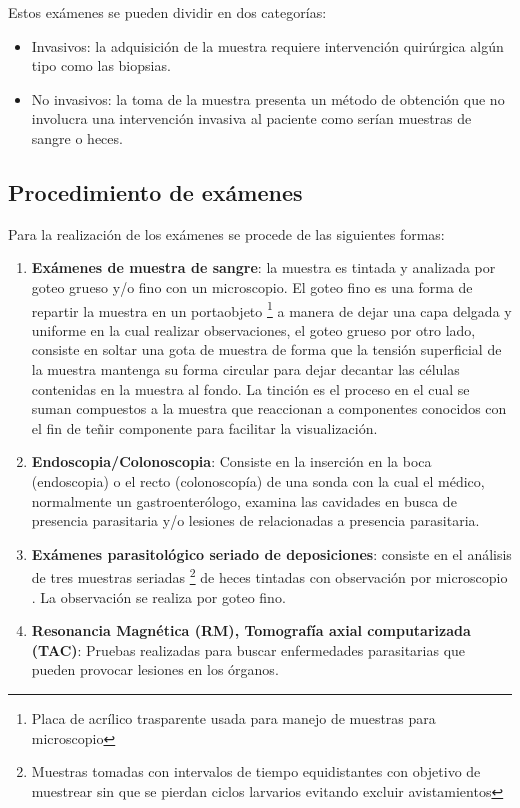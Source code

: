 \documentclass[letter,12pt]{report}
\begin{document}
Estos exámenes se pueden dividir en dos categorías:

\begin{itemize}
    \item Invasivos: la adquisición de la muestra requiere intervención
        quirúrgica algún tipo como las biopsias.
    \item No invasivos: la toma de la muestra presenta un método de obtención que no
        involucra una intervención invasiva al paciente como serían muestras de sangre o
        heces.
\end{itemize}

\subsection{Procedimiento de exámenes}

Para la realización de los exámenes se procede de las siguientes formas: \cite{Diagnost}

\begin{enumerate}
    \item \textbf{Exámenes de muestra de sangre}: la muestra es tintada y analizada por
        goteo grueso y/o fino con un microscopio. El goteo fino es una forma de repartir
        la muestra en un portaobjeto \footnote{Placa de acrílico trasparente usada para
        manejo de muestras para microscopio} a manera de dejar una capa delgada y
        uniforme en la cual realizar observaciones, el goteo grueso por otro lado,
        consiste en soltar una gota de muestra de forma que la tensión superficial de la
        muestra mantenga su forma circular para dejar decantar las células contenidas en
        la muestra al fondo.  La tinción es el proceso en el cual se suman compuestos a
        la muestra que reaccionan a componentes conocidos con el fin de teñir componente
        para facilitar la visualización.
    \item \textbf{Endoscopia/Colonoscopia}: Consiste en la inserción en la boca
        (endoscopia) o el recto (colonoscopía) de una sonda con la cual el médico,
        normalmente un gastroenterólogo, examina las cavidades en busca de presencia
        parasitaria y/o lesiones de relacionadas a presencia parasitaria.
    \item \textbf{Exámenes parasitológico seriado de deposiciones}: consiste en el
        análisis de tres muestras seriadas \footnote{Muestras tomadas con intervalos de
            tiempo equidistantes con objetivo de muestrear sin que se pierdan ciclos
        larvarios evitando excluir avistamientos} de heces tintadas con observación por
        microscopio . La observación se realiza por goteo fino.
    \item \textbf{Resonancia Magnética (RM), Tomografía axial computarizada (TAC)}:
        Pruebas realizadas para buscar enfermedades parasitarias que pueden provocar
        lesiones en los órganos.
\end{enumerate}
\end{document}
